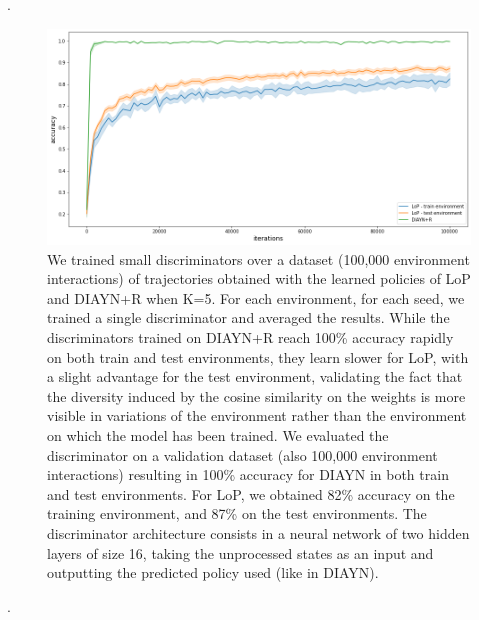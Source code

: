 \newpage
.
\vspace{3.5cm}

\begin{figure}[h!]
\centering
\includegraphics[width=1.\linewidth]{images/discriminator_accuracy.png}
\caption{We trained small discriminators over a dataset (100,000 environment interactions) of trajectories obtained with the learned policies of LoP and DIAYN+R when K=5. For each environment, for each seed, we trained a single discriminator and averaged the results. While the discriminators trained on DIAYN+R reach 100\% accuracy rapidly on both train and test environments, they learn slower for LoP, with a slight advantage for the test environment, validating the fact that the diversity induced by the cosine similarity on the weights is more visible in variations of the environment rather than the environment on which the model has been trained. We evaluated the discriminator on a validation dataset (also 100,000 environment interactions) resulting in 100\% accuracy for DIAYN in both train and test environments. For LoP, we obtained 82\% accuracy on the training environment, and 87\% on the test environments. The discriminator architecture consists in a neural network of two hidden layers of size 16, taking the unprocessed states as an input and outputting the predicted policy used (like in DIAYN).}
\label{fig:discriminator_accuracy}
\end{figure}

\newpage
.
\vspace{3.5cm}

